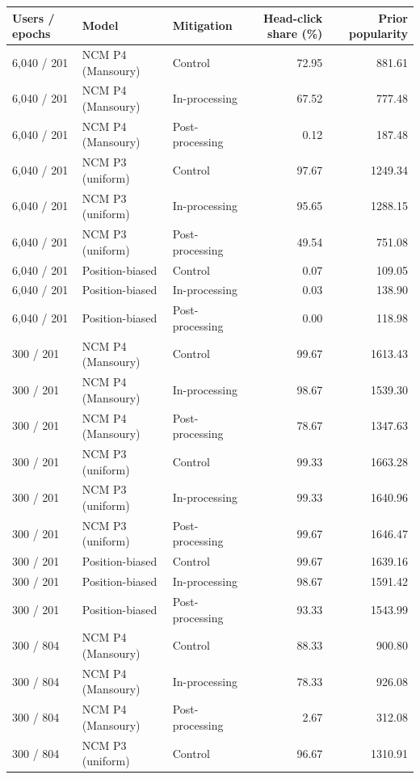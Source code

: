 \begin{table}[htbp!]
\centering
\small
\setlength{\tabcolsep}{3pt}
\renewcommand{\arraystretch}{1.1}
\begin{tabular}{lllrr}
\hline
Users / epochs & Model & Mitigation & Head-click share (\%) & Prior popularity \\
\hline
6,040 / 201 & NCM P4 (Mansoury) & Control & 72.95 & 881.61 \\
6,040 / 201 & NCM P4 (Mansoury) & In-processing & 67.52 & 777.48 \\
6,040 / 201 & NCM P4 (Mansoury) & Post-processing & 0.12 & 187.48 \\
6,040 / 201 & NCM P3 (uniform) & Control & 97.67 & 1249.34 \\
6,040 / 201 & NCM P3 (uniform) & In-processing & 95.65 & 1288.15 \\
6,040 / 201 & NCM P3 (uniform) & Post-processing & 49.54 & 751.08 \\
6,040 / 201 & Position-biased & Control & 0.07 & 109.05 \\
6,040 / 201 & Position-biased & In-processing & 0.03 & 138.90 \\
6,040 / 201 & Position-biased & Post-processing & 0.00 & 118.98 \\
300 / 201 & NCM P4 (Mansoury) & Control & 99.67 & 1613.43 \\
300 / 201 & NCM P4 (Mansoury) & In-processing & 98.67 & 1539.30 \\
300 / 201 & NCM P4 (Mansoury) & Post-processing & 78.67 & 1347.63 \\
300 / 201 & NCM P3 (uniform) & Control & 99.33 & 1663.28 \\
300 / 201 & NCM P3 (uniform) & In-processing & 99.33 & 1640.96 \\
300 / 201 & NCM P3 (uniform) & Post-processing & 99.67 & 1646.47 \\
300 / 201 & Position-biased & Control & 99.67 & 1639.16 \\
300 / 201 & Position-biased & In-processing & 98.67 & 1591.42 \\
300 / 201 & Position-biased & Post-processing & 93.33 & 1543.99 \\
300 / 804 & NCM P4 (Mansoury) & Control & 88.33 & 900.80 \\
300 / 804 & NCM P4 (Mansoury) & In-processing & 78.33 & 926.08 \\
300 / 804 & NCM P4 (Mansoury) & Post-processing & 2.67 & 312.08 \\
300 / 804 & NCM P3 (uniform) & Control & 96.67 & 1310.91 \\

\end{tabular}
\end{table}

